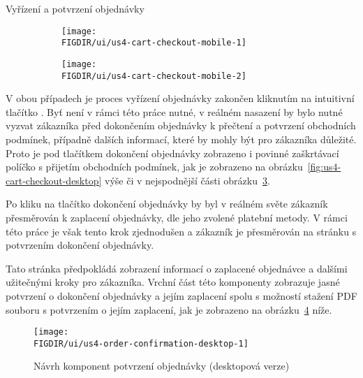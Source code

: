 \begin{subsection}{Vyřízení a potvrzení objednávky}
    \begin{figure}[H]
        \centering
        \caption{Návrh komponent dokončení objednávky (mobilní verze)}
        \begin{subfigure}{0.4\textwidth}
            \texttt{[image: \\FIGDIR/ui/us4-cart-checkout-mobile-1]}
            \label{fig:us4-cart-checkout-mobile-1}
        \end{subfigure}
        \hfill
        \begin{subfigure}{0.4\textwidth}
            \texttt{[image: \\FIGDIR/ui/us4-cart-checkout-mobile-2]}
            \label{fig:us4-cart-checkout-mobile-2}
        \end{subfigure}

        \source{}
        \label{fig:us4-cart-checkout-mobile}
    \end{figure}

    V obou případech je proces vyřízení objednávky zakončen kliknutím na intuitivní tlačítko .
    Byť není v rámci této práce nutné, v reálném nasazení by bylo nutné vyzvat zákazníka před dokončením objednávky k přečtení a potvrzení obchodních podmínek, případně dalších informací, které by mohly být pro zákazníka důležité.
    Proto je pod tlačítkem dokončení objednávky zobrazeno i povinné zaškrtávací políčko s přijetím obchodních podmínek, jak je zobrazeno na obrázku~\ref{fig:us4-cart-checkout-desktop} výše či v nejspodnější části obrázku~\ref{fig:us4-cart-checkout-mobile}.

    Po kliku na tlačítko dokončení objednávky by byl v reálném světe zákazník přesměrován k zaplacení objednávky, dle jeho zvolené platební metody.
    V rámci této práce je však tento krok zjednodušen a zákazník je přesměrován na stránku s potvrzením dokončení objednávky.

    Tato stránka předpokládá zobrazení informací o zaplacené objednávce a dalšími užitečnými kroky pro zákazníka.
    Vrchní část této komponenty zobrazuje jasné potvrzení o dokončení objednávky a jejím zaplacení spolu s možností stažení PDF souboru s potvrzením o jejím zaplacení, jak je zobrazeno na obrázku~\ref{fig:us4-order-confirmation-desktop} níže.

    \begin{figure}[H]
        \centering
        \caption{Návrh komponent potvrzení objednávky (desktopová verze)}
        \texttt{[image: \\FIGDIR/ui/us4-order-confirmation-desktop-1]}
        \source{}
        \label{fig:us4-order-confirmation-desktop}
    \end{figure}


\end{subsection}
